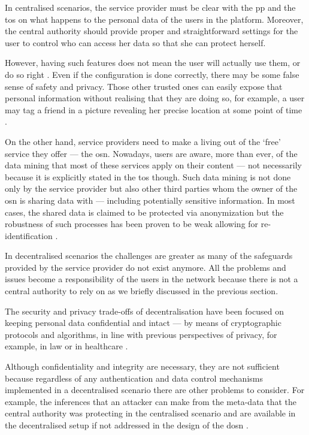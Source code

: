\documentclass[showtrims,oldfontcommands]{kthesis}
\begin{document}
In centralised scenarios, the service provider must be clear with the \ac{pp} and 
the \ac{tos} on what happens to the personal data of the users in the platform. 
Moreover, the central authority should provide proper and straightforward settings 
for the user to control who can access her data so that she can protect herself. 

However, having such features does not mean the user will actually use them, or   
do so right \cite{KrishnamurthyW08, BrandtzaegLS10}. Even if the configuration is 
done correctly, there may be some false sense of safety and privacy. Those other 
trusted ones can easily expose that personal information without realising that 
they are doing so, for example, a user may tag a friend in a picture revealing her 
precise location at some point of time \cite{ZhelevaG09, SmithSHV12}. 

On the other hand, service providers need to make a living out of the `free' service
they offer --- the \ac{osn}. Nowadays, users are aware, more than ever, of the data 
mining that most of these services apply on their content --- not necessarily because 
it is explicitly stated in the \ac{tos} though. Such data mining is not done only 
by the service provider but also other third parties whom the owner of the \ac{osn} 
is sharing data with --- including potentially sensitive information. In most cases, 
the shared data is claimed to be protected via anonymization but the robustness 
of such processes has been proven to be weak allowing for re-identification \cite{NarayananS09}.

In decentralised scenarios the challenges are greater as many of the safeguards 
provided by the service provider do not exist anymore. All the problems and issues 
become a responsibility of the users in the network because there is not a central 
authority to rely on as we briefly discussed in the previous section.

The security and privacy trade-offs of decentralisation have been focused on keeping 
personal data confidential and intact --- by means of cryptographic protocols and 
algorithms, in line with previous perspectives of privacy, for example, in law \cite{Harvey92} 
or in healthcare \cite{BarrowsC96}. 

Although confidentiality and integrity are necessary, they are not sufficient because 
regardless of any authentication and data control mechanisms implemented in a decentralised 
scenario there are other problems to consider. For example, the inferences that 
an attacker can make from the meta-data that the central authority was protecting 
in the centralised scenario and are available in the decentralised setup if not addressed 
in the design of the \ac{dosn} \cite{GreschbachKB12}.
\end{document}
